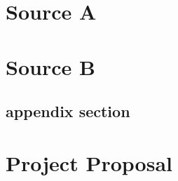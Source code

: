 \documentclass[12pt,a4paper,twoside,openright]{report}
\begin{document}


\appendix

\chapter{Source A}


\chapter{Source B}

\section{appendix section}\label{referencedAppendixTag}


\chapter{Project Proposal}



 
\end{document}
